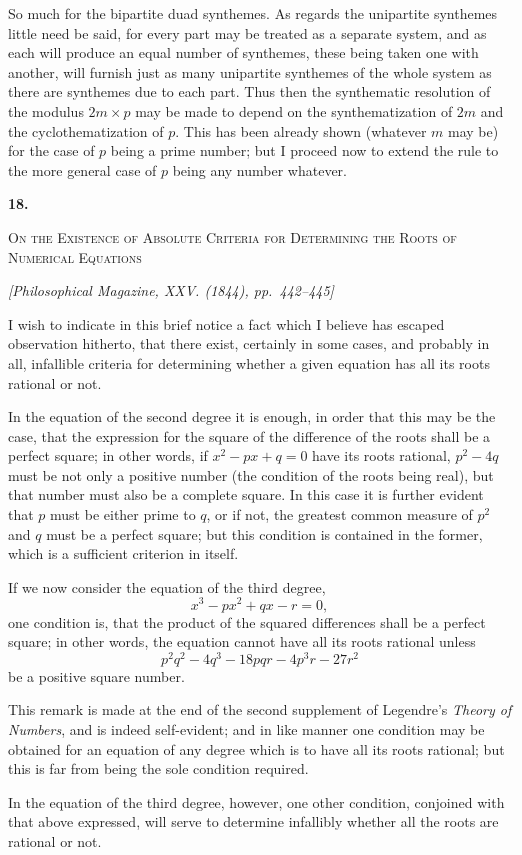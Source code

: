 \documentclass[11pt]{article}
\newcommand{\paperhead}[3]{%
  \clearpage
  \begin{center}
  {\Large\bfseries #1.}\par\vspace{0.85em}
  {\large\scshape #2}\par\vspace{0.6em}
  {\itshape [#3]}\par
  \end{center}\vspace{0.4em}}
\newcommand{\sourcepage}[1]{\marginpar{\scriptsize p.~#1}}
\begin{document}
{{So much for the bipartite duad synthemes. As regards the unipartite synthemes little need be said, for every part may be treated as a separate system, and as each will produce an equal number of synthemes, these being taken one with another, will furnish just as many unipartite synthemes of the whole system as there are synthemes due to each part. Thus then the synthematic resolution of the modulus $2m\times p$ may be made to depend on the synthematization of $2m$ and the cyclothematization of $p$. This has been already shown (whatever $m$ may be) for the case of $p$ being a prime number; but I proceed now to extend the rule to the more general case of $p$ being any number whatever.

\paperhead{18}{On the Existence of Absolute Criteria for Determining the Roots of Numerical Equations}{Philosophical Magazine, XXV. (1844), pp.~442--445}

\sourcepage{103}
I wish to indicate in this brief notice a fact which I believe has escaped observation hitherto, that there exist, certainly in some cases, and probably in all, infallible criteria for determining whether a given equation has all its roots rational or not.

In the equation of the second degree it is enough, in order that this may be the case, that the expression for the square of the difference of the roots shall be a perfect square; in other words, if $x^2-px+q=0$ have its roots rational, $p^2-4q$ must be not only a positive number (the condition of the roots being real), but that number must also be a complete square. In this case it is further evident that $p$ must be either prime to $q$, or if not, the greatest common measure of $p^2$ and $q$ must be a perfect square; but this condition is contained in the former, which is a sufficient criterion in itself.

If we now consider the equation of the third degree,
\[
x^3-px^2+qx-r=0,
\]
one condition is, that the product of the squared differences shall be a perfect square; in other words, the equation cannot have all its roots rational unless
\[
p^2q^2-4q^3-18pqr-4p^3r-27r^2
\]
be a positive square number.

This remark is made at the end of the second supplement of Legendre's \emph{Theory of Numbers}, and is indeed self-evident; and in like manner one condition may be obtained for an equation of any degree which is to have all its roots rational; but this is far from being the sole condition required.

\sourcepage{104}
In the equation of the third degree, however, one other condition, conjoined with that above expressed, will serve to determine infallibly whether all the roots are rational or not.

}}
\end{document}
